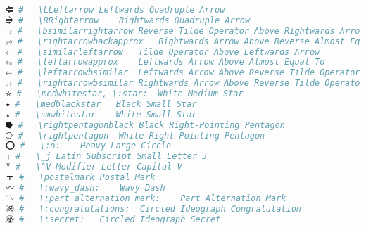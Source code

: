 \begin{lstlisting}[language=Julia, style=julia, linewidth=\textwidth]
⭅ #   \LLeftarrow Leftwards Quadruple Arrow
⭆ #   \RRightarrow    Rightwards Quadruple Arrow
⭇ #   \bsimilarrightarrow Reverse Tilde Operator Above Rightwards Arrow
⭈ #   \rightarrowbackapprox   Rightwards Arrow Above Reverse Almost Equal To
⭉ #   \similarleftarrow   Tilde Operator Above Leftwards Arrow
⭊ #   \leftarrowapprox    Leftwards Arrow Above Almost Equal To
⭋ #   \leftarrowbsimilar  Leftwards Arrow Above Reverse Tilde Operator
⭌ #   \rightarrowbsimilar Rightwards Arrow Above Reverse Tilde Operator
⭐ #   \medwhitestar, \:star:  White Medium Star
⭑ #   \medblackstar   Black Small Star
⭒ #   \smwhitestar    White Small Star
⭓ #   \rightpentagonblack Black Right-Pointing Pentagon
⭔ #   \rightpentagon  White Right-Pointing Pentagon
⭕ #   \:o:    Heavy Large Circle
ⱼ #   \_j Latin Subscript Small Letter J
ⱽ #   \^V Modifier Letter Capital V
〒 #   \postalmark Postal Mark
〰 #   \:wavy_dash:    Wavy Dash
〽 #   \:part_alternation_mark:    Part Alternation Mark
㊗ #   \:congratulations:  Circled Ideograph Congratulation
㊙ #   \:secret:   Circled Ideograph Secret
\end{lstlisting}


